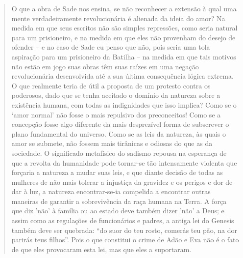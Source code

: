 \begin{quote}
O que a obra de Sade nos ensina, se não reconhecer a extensão à qual uma
mente verdadeiramente revolucionária é alienada da ideia do amor? Na
medida em que seus escritos não são simples repressões, como seria
natural para um prisioneiro, e na medida em que eles não provenham do
desejo de ofender -- e no caso de Sade eu penso que não, pois seria uma
tola aspiração para um prisioneiro da Batilha -- na medida em que tais
motivos não estão em jogo suas obras têm suas raízes em uma negação
revolucionária desenvolvida até a sua última consequência lógica
extrema. O que realmente teria de útil a proposta de um protesto contra
os poderosos, dado que se tenha aceitado o domínio da natureza sobre a
existência humana, com todas as indignidades que isso implica? Como se o
`amor normal' não fosse o mais repulsivo dos preconceitos! Como se a
concepção fosse algo diferente da mais desprezível forma de subscrever o
plano fundamental do universo. Como se as leis da natureza, às quais o
amor se submete, não fossem mais tirânicas e odiosas do que as da
sociedade. O significado metafísico do sadismo repousa na esperança de
que a revolta da humanidade pode tornar-se tão intensamente violenta que
forçaria a natureza a mudar suas leis, e que diante decisão de todas as
mulheres de não mais tolerar a injustiça da gravidez e os perigos e dor
de dar à luz, a natureza encontrar-se-ia compelida a encontrar outras
maneiras de garantir a sobrevivência da raça humana na Terra. A força
que diz 'não' à família ou ao estado deve também dizer 'não' a Deus; e
assim como as regulações de funcionários e padres, a antiga lei do
Genesis também deve ser quebrada: ``do suor do teu rosto, comerás teu
pão, na dor parirás teus filhos''. Pois o que constitui o crime de Adão
e Eva não é o fato de que eles provocaram esta lei, mas que eles a
suportaram.
\end{quote}

